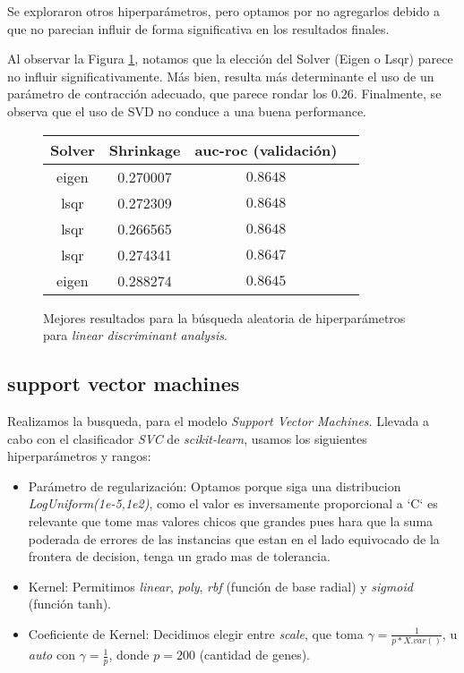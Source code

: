 Se exploraron otros hiperparámetros, pero optamos por no agregarlos debido a que no parecian influir de forma significativa en los resultados finales. 

Al observar la Figura \ref{lda}, notamos que la elección del Solver (Eigen o Lsqr) parece no influir significativamente. Más bien, resulta más determinante el uso de un parámetro de contracción adecuado, que parece rondar los $0.26$. Finalmente, se observa que el uso de SVD no conduce a una buena performance.

\vspace{0.5em}
\begin{figure}[!htbp]
    \begin{center}
        \begin{tabular}{ |c|c|c|c| } 
         \hline
        Solver   & Shrinkage & auc-roc (validación) \\
        \hline
        eigen                   &  0.270007          & $0.8648$  \\ 
        lsqr                    &  0.272309          & $0.8648$  \\
        lsqr                    &  0.266565          & $0.8648$  \\ 
        lsqr                    &  0.274341          & $0.8647$  \\
        eigen                   &  0.288274          & $0.8645$  \\ 
        \hline
        \end{tabular}
    \end{center}
    \caption{Mejores resultados para la búsqueda aleatoria de hiperparámetros para \textit{linear discriminant analysis}.} \label{lda}
\end{figure}

\subsection{support vector machines}
Realizamos la busqueda, para el modelo \textit{Support Vector Machines}. Llevada a cabo con el clasificador \textit{SVC} de \textit{scikit-learn}, usamos los siguientes hiperparámetros y rangos: 

\begin{itemize}
    \item Parámetro de regularización: Optamos porque siga una distribucion \textit{LogUniform(1e-5,1e2)}, como el valor es inversamente proporcional a `C` es relevante que tome mas valores chicos que grandes pues hara que la suma poderada de errores de las instancias que estan en el lado equivocado de la frontera de decision, tenga un grado mas de tolerancia.
    \item Kernel: Permitimos \textit{linear}, \textit{poly}, \textit{rbf} (función de base radial) y \textit{sigmoid} (función tanh).
    \item Coeficiente de Kernel: Decidimos elegir entre \textit{scale}, que toma $ \gamma = \frac{1}{p*X.var()}$, u \textit{auto} con $\gamma = \frac{1}{p} $, donde $p=200$ (cantidad de genes).
\end{itemize}

